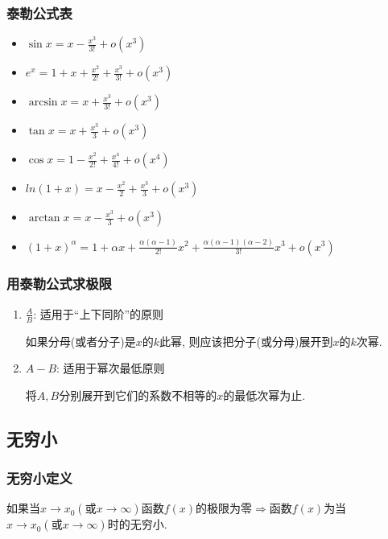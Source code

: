 \subsubsection{泰勒公式表}
\begin{multicols}{2}
\begin{itemize}
\item $ \sin x=x-\frac{x^{3}}{3!}+o(x^{3}) $
\item $ e^{x}=1+x+\frac{x^{2}}{2!}+\frac{x^{3}}{3!}+o(x^{3}) $
\item $ \arcsin x=x+\frac{x^{3}}{3!}+o(x^{3}) $
\item $ \tan x=x+\frac{x^{3}}{3}+o(x^{3}) $
\item $ \cos x=1-\frac{x^{2}}{2!}+\frac{x^{4}}{4!}+o(x^{4}) $
\item $ ln(1+x)=x-\frac{x^{2}}{2}+\frac{x^{3}}{3}+o(x^{3}) $
\item $ \arctan x=x-\frac{x^{3}}{3}+o(x^{3}) $
\item $ (1+x)^{\alpha}=1+\alpha x+\frac{\alpha (\alpha -1)}{2!}x^{2}+\frac{\alpha (\alpha -1)(\alpha -2)}{3!}x^{3}+o(x^{3}) $
\end{itemize}
\end{multicols}
\subsubsection{用泰勒公式求极限}
\begin{enumerate}
\item $ \frac{A}{B} $: 适用于``上下同阶''的原则 \par
如果分母(或者分子)是$ x $的$ k $此幂, 则应该把分子(或分母)展开到$ x $的$ k $次幂.
\item $ A-B $: 适用于幂次最低原则 \par
将$ A, B $分别展开到它们的系数不相等的$ x $的最低次幂为止.
\end{enumerate}
\subsection{无穷小}
\subsubsection{无穷小定义}
如果当$ x\rightarrow x_{0}(\text{或}x\rightarrow \infty) $函数$ f(x) $的极限为零$ \Rightarrow  $函数$ f(x) $为当$ x \rightarrow x_{0}(\text{或}x \rightarrow \infty ) $时的无穷小.
